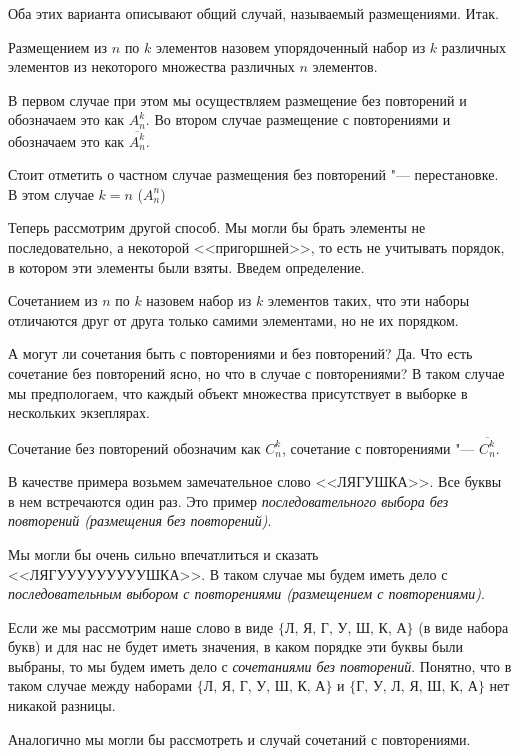 Оба этих варианта описывают общий случай, называемый размещениями. Итак.

\begin{definition}
    Размещением из $n$ по $k$ элементов назовем упорядоченный набор
    из $k$ различных элементов из некоторого множества различных $n$ элементов.
\end{definition}

В первом случае при этом мы осуществляем размещение без повторений
и обозначаем это как $A_n^k$. Во втором случае размещение с повторениями
и обозначаем это как $\overline{A_n^k}$.

Стоит отметить о частном случае размещения без повторений "--- перестановке.
В этом случае $k = n$ ($A_n^n$)

Теперь рассмотрим другой способ. Мы могли бы брать элементы не последовательно,
а некоторой <<пригоршней>>, то есть не учитывать порядок, в котором эти
элементы были взяты. Введем определение.

\begin{definition}
    Сочетанием из $n$ по $k$ назовем набор из $k$ элементов таких, что
    эти наборы отличаются друг от друга только самими элементами, но не их
    порядком.
\end{definition}

А могут ли сочетания быть с повторениями и без повторений? Да. Что есть 
сочетание без повторений ясно, но что в случае с повторениями? В таком случае
мы предпологаем, что каждый объект множества присутствует в выборке в нескольких
экзеплярах.

Сочетание без повторений обозначим как $C_n^k$, сочетание с повторениями 
"--- $\overline{C_n^k}$.

\begin{example}
    В качестве примера возьмем замечательное слово <<ЛЯГУШКА>>. Все буквы
    в нем встречаются один раз. Это пример \textit{последовательного выбора без повторений (размещения без повторений)}.
    
    Мы могли бы очень сильно впечатлиться и сказать <<ЛЯГУУУУУУУУУШКА>>.
    В таком случае мы будем иметь дело с \textit{последовательным выбором с повторениями (размещением с повторениями)}.
    
    Если же мы рассмотрим наше слово в виде $\{\text{Л, Я, Г, У, Ш, К, А}\}$ (в виде набора букв)
    и для нас не будет иметь значения, в каком порядке эти буквы были выбраны, то мы будем
    иметь дело с \textit{сочетаниями без повторений}. 
    Понятно, что в таком случае между
    наборами $\{\text{Л, Я, Г, У, Ш, К, А}\}$ и $\{\text{Г, У, Л, Я, Ш, К, А}\}$ нет никакой разницы.
    
    Аналогично мы могли бы рассмотреть и случай сочетаний с повторениями.
\end{example}

